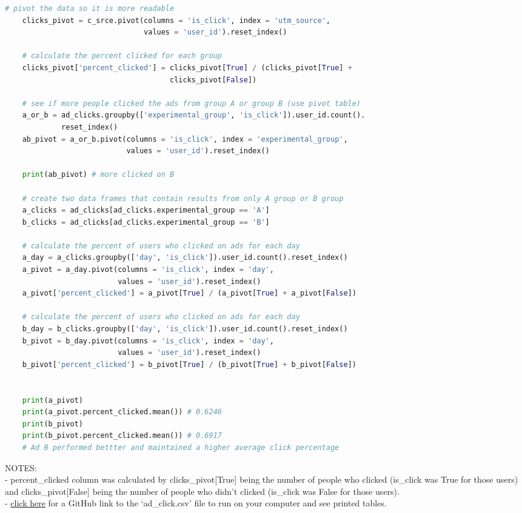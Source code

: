 \documentclass[11pt, a4paper]{article}
\begin{document}
\begin{spacing}{1.1}
\begin{lstlisting}[language=Python]
	# pivot the data so it is more readable
	clicks_pivot = c_srce.pivot(columns = 'is_click', index = 'utm_source', 
	                            values = 'user_id').reset_index()
	                                      
	# calculate the percent clicked for each group
	clicks_pivot['percent_clicked'] = clicks_pivot[True] / (clicks_pivot[True] + 
	                                  clicks_pivot[False])
	                                  
	# see if more people clicked the ads from group A or group B (use pivot table)
	a_or_b = ad_clicks.groupby(['experimental_group', 'is_click']).user_id.count().
	         reset_index()
	ab_pivot = a_or_b.pivot(columns = 'is_click', index = 'experimental_group', 
	                        values = 'user_id').reset_index()
	                      
	print(ab_pivot) # more clicked on B
	
	# create two data frames that contain results from only A group or B group
	a_clicks = ad_clicks[ad_clicks.experimental_group == 'A']
	b_clicks = ad_clicks[ad_clicks.experimental_group == 'B']
	
	# calculate the percent of users who clicked on ads for each day
	a_day = a_clicks.groupby(['day', 'is_click']).user_id.count().reset_index()
	a_pivot = a_day.pivot(columns = 'is_click', index = 'day', 
	                      values = 'user_id').reset_index()
	a_pivot['percent_clicked'] = a_pivot[True] / (a_pivot[True] + a_pivot[False])
	
	# calculate the percent of users who clicked on ads for each day
	b_day = b_clicks.groupby(['day', 'is_click']).user_id.count().reset_index()
	b_pivot = b_day.pivot(columns = 'is_click', index = 'day', 
	                      values = 'user_id').reset_index()
	b_pivot['percent_clicked'] = b_pivot[True] / (b_pivot[True] + b_pivot[False])
	
	
	print(a_pivot)
	print(a_pivot.percent_clicked.mean()) # 0.6246
	print(b_pivot)
	print(b_pivot.percent_clicked.mean()) # 0.6917 
	# Ad B performed bettter and maintained a higher average click percentage \end{lstlisting}\vspace*{3mm}
	NOTES: \\
	- percent\_clicked column was calculated by clicks\_pivot[True] being the number of people who clicked \hspace*{2mm} (is\_click was True for those users) and clicks\_pivot[False] being the number of people who didn't clicked \hspace*{2mm} (is\_click was False for those users). \vspace*{4mm} \\
	- \href{https://github.com/strongdan/intro-data-analysis-codecademy/blob/master/ad_clicks.csv}{click here} for a GitHub link to the `ad\_click.csv' file to run on your computer and see printed tables. \newpage 
	

\end{spacing}
\end{document}
